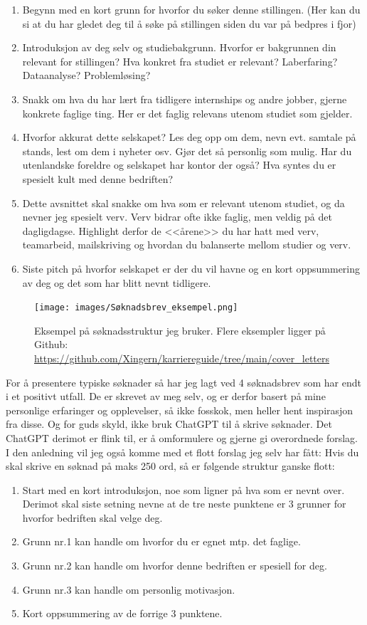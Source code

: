 \begin{enumerate}
    \item Begynn med en kort grunn for hvorfor du søker denne stillingen. (Her kan du si at du har gledet deg til å søke på stillingen siden du var på bedpres i fjor)
    \item Introduksjon av deg selv og studiebakgrunn. Hvorfor er bakgrunnen din relevant for stillingen? Hva konkret fra studiet er relevant? Laberfaring? Dataanalyse? Problemløsing?
    \item Snakk om hva du har lært fra tidligere internships og andre jobber, gjerne konkrete faglige ting. Her er det faglig relevans utenom studiet som gjelder.
    \item Hvorfor akkurat dette selskapet? Les deg opp om dem, nevn evt. samtale på stands, lest om dem i nyheter osv. Gjør det så personlig som mulig. Har du utenlandske foreldre og selskapet har kontor der også? Hva syntes du er spesielt kult med denne bedriften?
    \item Dette avsnittet skal snakke om hva som er relevant utenom studiet, og da nevner jeg spesielt verv. Verv bidrar ofte ikke faglig, men veldig på det dagligdagse. Highlight derfor de <<årene>> du har hatt med verv, teamarbeid, mailskriving og hvordan du balanserte mellom studier og verv. 
    \item Siste pitch på hvorfor selskapet er der du vil havne og en kort oppsummering av deg og det som har blitt nevnt tidligere. 
\end{enumerate}

\begin{figure}[H]
    \centering
    \texttt{[image: images/Søknadsbrev\_eksempel.png]}
    \caption{Eksempel på søknadsstruktur jeg bruker. Flere eksempler ligger på Github: \url{https://github.com/Xingern/karriereguide/tree/main/cover_letters}}
\end{figure}

For å presentere typiske søknader så har jeg lagt ved 4 søknadsbrev som har endt i et positivt utfall. De er skrevet av meg selv, og er derfor basert på mine personlige erfaringer og opplevelser, så ikke fosskok, men heller hent inspirasjon fra disse. Og for guds skyld, ikke bruk ChatGPT til å skrive søknader. Det ChatGPT derimot er flink til, er å omformulere og gjerne gi overordnede forslag. I den anledning vil jeg også komme med et flott forslag jeg selv har fått: Hvis du skal skrive en søknad på maks 250 ord, så er følgende struktur ganske flott:

\begin{enumerate}
    \item Start med en kort introduksjon, noe som ligner på hva som er nevnt over. Derimot skal siste setning nevne at de tre neste punktene er 3 grunner for hvorfor bedriften skal velge deg.
    \item Grunn nr.1 kan handle om hvorfor du er egnet mtp. det faglige.
    \item Grunn nr.2 kan handle om hvorfor denne bedriften er spesiell for deg.
    \item Grunn nr.3 kan handle om personlig motivasjon.
    \item Kort oppsummering av de forrige 3 punktene.
\end{enumerate}


